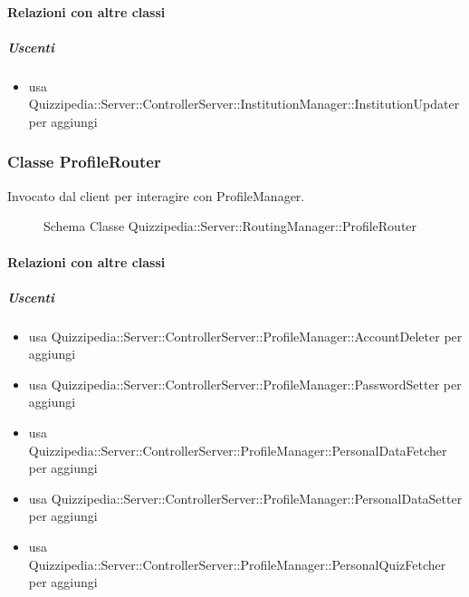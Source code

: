 \paragraph{Relazioni con altre classi}
\subparagraph{Uscenti}
\begin{itemize}
\item usa Quizzipedia::Server::ControllerServer::InstitutionManager::InstitutionUpdater per aggiungi
\end{itemize}
\subsubsection{Classe ProfileRouter}
Invocato dal client per interagire con ProfileManager.
\begin{figure}[H]
\centering
\noindent{}
\caption[Schema Classe ProfileRouter]{Schema Classe Quizzipedia::Server::RoutingManager::ProfileRouter}
\end{figure}
\paragraph{Relazioni con altre classi}
\subparagraph{Uscenti}
\begin{itemize}
\item usa Quizzipedia::Server::ControllerServer::ProfileManager::AccountDeleter per aggiungi
\item usa Quizzipedia::Server::ControllerServer::ProfileManager::PasswordSetter per aggiungi
\item usa Quizzipedia::Server::ControllerServer::ProfileManager::PersonalDataFetcher per aggiungi
\item usa Quizzipedia::Server::ControllerServer::ProfileManager::PersonalDataSetter per aggiungi
\item usa Quizzipedia::Server::ControllerServer::ProfileManager::PersonalQuizFetcher per aggiungi
\end{itemize}
